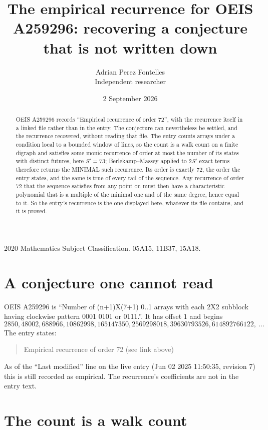 \documentclass[11pt,a4paper]{article}
\title{The empirical recurrence for OEIS A259296: recovering a conjecture that is not written down}
\author{Adrian Perez Fontelles\\ \small Independent researcher}
\date{2 September 2026}
\theoremstyle{plain}
\theoremstyle{definition}
\begin{document}
\maketitle

\begin{abstract}
OEIS A259296 records ``Empirical recurrence of order $72$'', with the recurrence itself in a
linked file rather than in the entry. The conjecture can nevertheless be settled, and the
recurrence recovered, without reading that file. The entry counts arrays under a condition
local to a bounded window of lines, so the count is a walk count on a finite digraph and
satisfies some monic recurrence of order at most the number of its states with distinct
futures, here $S'=73$; Berlekamp--Massey applied to $2S'$ exact
terms therefore returns the MINIMAL such recurrence. Its order is exactly $72$, the order
the entry states, and the same is true of every tail of the sequence. Any recurrence of order
$72$ that the sequence satisfies from any point on must then have a characteristic
polynomial that is a multiple of the minimal one and of the same degree, hence equal to it. So
the entry's recurrence is the one displayed here, whatever its file contains, and it is
proved.
\end{abstract}

\noindent\small 2020 Mathematics Subject Classification. 05A15, 11B37, 15A18.\normalsize

\section{A conjecture one cannot read}

OEIS A259296 is ``Number of (n+1)X(7+1) 0..1 arrays with each 2X2 subblock having clockwise pattern 0001 0101 or 0111.''. It has offset $1$ and begins
\[
2850, 48002, 688966, 10862998, 165147350, 2569298018, 39630793526, 614892766122,\ \dots
\]
The entry states:
\begin{quote}
Empirical recurrence of order 72 (see link above)
\end{quote}
As of the ``Last modified'' line on the live entry (Jun 02 2025 11:50:35, revision 7) this is still
recorded as empirical. The recurrence's coefficients are not in the entry text.

\section{The count is a walk count}
\end{document}
